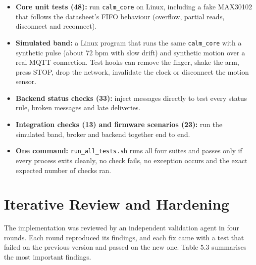 \documentclass[12pt,letterpaper,oneside]{report}
\begin{document}
\begin{itemize}\item \textbf{Core unit tests (48):} run \texttt{calm\_\allowbreak{}core} on Linux, including a fake MAX30102 that follows the datasheet's FIFO behaviour (overflow, partial reads, disconnect and reconnect).
\item \textbf{Simulated band:} a Linux program that runs the same \texttt{calm\_\allowbreak{}core} with a synthetic pulse (about 72 bpm with slow drift) and synthetic motion over a real MQTT connection. Test hooks can remove the finger, shake the arm, press STOP, drop the network, invalidate the clock or disconnect the motion sensor.
\item \textbf{Backend status checks (33):} inject messages directly to test every status rule, broken messages and late deliveries.
\item \textbf{Integration checks (13) and firmware scenarios (23):} run the simulated band, broker and backend together end to end.
\item \textbf{One command:} \texttt{run\_\allowbreak{}all\_\allowbreak{}tests.sh} runs all four suites and passes only if every process exits cleanly, no check fails, no exception occurs and the exact expected number of checks ran.
\end{itemize}

\section{Iterative Review and Hardening}\label{sec:5.6}

The implementation was reviewed by an independent validation agent in four rounds. Each round reproduced its findings, and each fix came with a test that failed on the previous version and passed on the new one. Table 5.3 summarises the most important findings.
\end{document}
